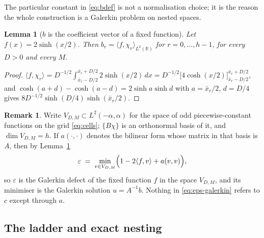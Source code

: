 \documentclass[11pt,a4paper]{article}
\theoremstyle{plain}
\newtheorem{lemma}[theorem]{Lemma}
\theoremstyle{definition}
\newtheorem{remark}[theorem]{Remark}
\newcommand{\R}{\mathbb{R}}
\begin{document}
The particular constant in \eqref{eq:bdef} is not a normalisation choice; it is the
reason the whole construction is a Galerkin problem on nested spaces.

\begin{lemma}[$b$ is the coefficient vector of a fixed function]
\label{lem:bcoeff}
Let $f(x)=2\sinh(x/2)$. Then $b_{r}=\langle f,\chi_{r}\rangle_{L^{2}(\R)}$ for
$r=0,\dots,h-1$, for every $D>0$ and every $M$.
\end{lemma}

\begin{proof}
$\langle f,\chi_{r}\rangle
 =D^{-1/2}\int_{\bar x_{r}-D/2}^{\bar x_{r}+D/2}2\sinh(x/2)\,dx
 =D^{-1/2}\bigl[4\cosh(x/2)\bigr]_{\bar x_{r}-D/2}^{\bar x_{r}+D/2}$,
and $\cosh(a+d)-\cosh(a-d)=2\sinh a\sinh d$ with $a=\bar x_{r}/2$, $d=D/4$ gives
$8D^{-1/2}\sinh(D/4)\sinh(\bar x_{r}/2)$.
\end{proof}

\begin{remark}
\label{rem:galerkin}
Write $V_{D,M}\subset L^{2}(-\alpha,\alpha)$ for the space of odd piecewise-constant
functions on the grid \eqref{eq:cells}; $\{B\chi\}$ is an orthonormal basis of it, and
$\dim V_{D,M}=h$. If $a(\cdot,\cdot)$ denotes the bilinear form whose matrix in that
basis is $A$, then by Lemma~\ref{lem:bcoeff}
\begin{equation}
\label{eq:eps-galerkin}
  \varepsilon \;=\; \min_{v\in V_{D,M}}\Bigl(1-2\langle f,v\rangle+a(v,v)\Bigr),
\end{equation}
so $\varepsilon$ is the Galerkin defect of the fixed function $f$ in the space
$V_{D,M}$, and its minimiser is the Galerkin solution $u=A^{-1}b$. Nothing in
\eqref{eq:eps-galerkin} refers to $c$ except through $a$.
\end{remark}

\subsection{The ladder and exact nesting}
\label{sec:ladder}
\end{document}
